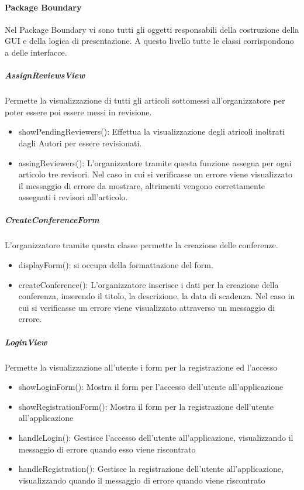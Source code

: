 \paragraph{Package Boundary}
\label{sec:package_boundary}

Nel Package Boundary vi sono tutti gli oggetti responsabili della costruzione della GUI e della logica di presentazione. A questo livello tutte le classi corrispondono a delle interfacce. 

\subparagraph{AssignReviewsView}
Permette la visualizzazione di tutti gli articoli sottomessi all'organizzatore per poter essere poi essere messi in revisione.
\begin{itemize}
\item showPendingReviewers(): Effettua la visualizzazione degli atricoli inoltrati dagli Autori per essere revisionati.\\
\item assingReviewers(): L'organizzatore tramite questa funzione assegna per ogni articolo tre revisori. Nel caso in cui si verificasse un errore viene visualizzato il messaggio di errore da mostrare, altrimenti vengono correttamente assegnati i revisori all'articolo.\\
\end{itemize}


\subparagraph{CreateConferenceForm}
L'organizzatore tramite questa classe permette la creazione delle conferenze.\\
\begin{itemize}
\item displayForm(): si occupa della formattazione del form.\\
\item createConference(): L'organizzatore inserisce i dati per la creazione della conferenza, inserendo il titolo, la descrizione, la data di scadenza. Nel caso in cui si verificasse un errore viene visualizzato attraverso un messaggio di errore.
\end{itemize}

\subparagraph{LoginView}
Permette la visualizzazione all'utente i form per la registrazione ed l'accesso\\
\begin{itemize}
\item showLoginForm(): Mostra il form per l'accesso dell'utente all'applicazione\\
\item showRegistrationForm(): Mostra il form per la registrazione dell'utente all'applicazione\\
\item handleLogin(): Gestisce l'accesso dell'utente all'applicazione, visualizzando il messaggio di errore quando esso viene riscontrato\\
\item handleRegistration(): Gestisce la registrazione dell'utente all'applicazione, visualizzando quando il messaggio di errore quando viene riscontrato\\
\end{itemize}

